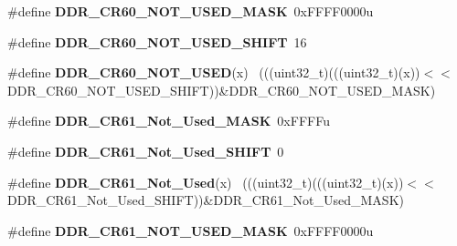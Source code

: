 \begin{DoxyCompactItemize}
\item 
\hypertarget{group___d_d_r___register___masks_ga1f142ff992b01ac64a9044a176efee56}{}\#define {\bfseries D\+D\+R\+\_\+\+C\+R60\+\_\+\+N\+O\+T\+\_\+\+U\+S\+E\+D\+\_\+\+M\+A\+S\+K}~0x\+F\+F\+F\+F0000u\label{group___d_d_r___register___masks_ga1f142ff992b01ac64a9044a176efee56}

\item 
\hypertarget{group___d_d_r___register___masks_gad2c00166c19f002eb32e6dfee58d20c1}{}\#define {\bfseries D\+D\+R\+\_\+\+C\+R60\+\_\+\+N\+O\+T\+\_\+\+U\+S\+E\+D\+\_\+\+S\+H\+I\+F\+T}~16\label{group___d_d_r___register___masks_gad2c00166c19f002eb32e6dfee58d20c1}

\item 
\hypertarget{group___d_d_r___register___masks_ga65c0b3e67914f24d99ffee501ab50c50}{}\#define {\bfseries D\+D\+R\+\_\+\+C\+R60\+\_\+\+N\+O\+T\+\_\+\+U\+S\+E\+D}(x)                                      ~(((uint32\+\_\+t)(((uint32\+\_\+t)(x))$<$$<$D\+D\+R\+\_\+\+C\+R60\+\_\+\+N\+O\+T\+\_\+\+U\+S\+E\+D\+\_\+\+S\+H\+I\+F\+T))\&D\+D\+R\+\_\+\+C\+R60\+\_\+\+N\+O\+T\+\_\+\+U\+S\+E\+D\+\_\+\+M\+A\+S\+K)\label{group___d_d_r___register___masks_ga65c0b3e67914f24d99ffee501ab50c50}

\item 
\hypertarget{group___d_d_r___register___masks_gaef8af3470a55f398165423777c1e7517}{}\#define {\bfseries D\+D\+R\+\_\+\+C\+R61\+\_\+\+Not\+\_\+\+Used\+\_\+\+M\+A\+S\+K}~0x\+F\+F\+F\+Fu\label{group___d_d_r___register___masks_gaef8af3470a55f398165423777c1e7517}

\item 
\hypertarget{group___d_d_r___register___masks_gae1d12ffbc26f56d82baee78830af9a76}{}\#define {\bfseries D\+D\+R\+\_\+\+C\+R61\+\_\+\+Not\+\_\+\+Used\+\_\+\+S\+H\+I\+F\+T}~0\label{group___d_d_r___register___masks_gae1d12ffbc26f56d82baee78830af9a76}

\item 
\hypertarget{group___d_d_r___register___masks_ga27c7d13c998b4943822fb3097d5b9428}{}\#define {\bfseries D\+D\+R\+\_\+\+C\+R61\+\_\+\+Not\+\_\+\+Used}(x)                                      ~(((uint32\+\_\+t)(((uint32\+\_\+t)(x))$<$$<$D\+D\+R\+\_\+\+C\+R61\+\_\+\+Not\+\_\+\+Used\+\_\+\+S\+H\+I\+F\+T))\&D\+D\+R\+\_\+\+C\+R61\+\_\+\+Not\+\_\+\+Used\+\_\+\+M\+A\+S\+K)\label{group___d_d_r___register___masks_ga27c7d13c998b4943822fb3097d5b9428}

\item 
\hypertarget{group___d_d_r___register___masks_ga6b1772b78171e5df81e1a82a1ae0edbd}{}\#define {\bfseries D\+D\+R\+\_\+\+C\+R61\+\_\+\+N\+O\+T\+\_\+\+U\+S\+E\+D\+\_\+\+M\+A\+S\+K}~0x\+F\+F\+F\+F0000u\label{group___d_d_r___register___masks_ga6b1772b78171e5df81e1a82a1ae0edbd}


\end{DoxyCompactItemize}
